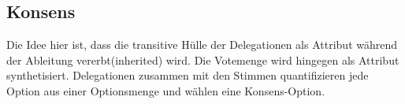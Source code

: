\documentclass[]{article}
\begin{document}
\subsection{Konsens}


Die Idee hier ist, dass die transitive Hülle der Delegationen als
Attribut während der Ableitung vererbt(inherited) wird. Die Votemenge
wird hingegen als Attribut synthetisiert.\cite{Knuth1968} Delegationen zusammen mit den Stimmen quantifizieren jede Option aus einer Optionsmenge und wählen
eine Konsens-Option.


% 
% 
% 
% 
% 
% 


% 
% 
%   
% 
% 
% 
\end{document}
